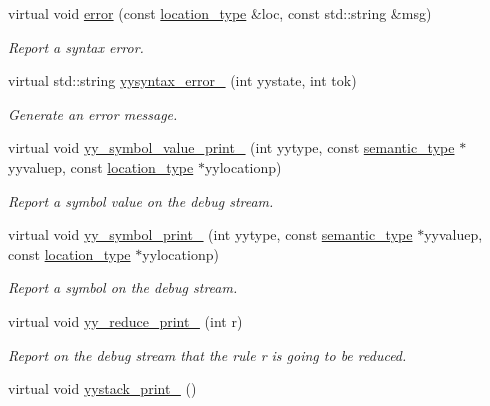 \begin{DoxyCompactItemize}
\item 
virtual void \hyperlink{classyy_1_1CParser_a693a79aaae672751347350ad9f3498f6}{error} (const \hyperlink{classyy_1_1CParser_a674649435d1e3521d1e820a5139f7232}{location\-\_\-type} \&loc, const std\-::string \&msg)
\begin{DoxyCompactList}\small\item\em Report a syntax error. \end{DoxyCompactList}\item 
virtual std\-::string \hyperlink{classyy_1_1CParser_a6d1ef79065605df3e89d4e2d92d6f17b}{yysyntax\-\_\-error\-\_\-} (int yystate, int tok)
\begin{DoxyCompactList}\small\item\em Generate an error message. \end{DoxyCompactList}\item 
virtual void \hyperlink{classyy_1_1CParser_a510cc68a99550d7e7e7b0746ac3652be}{yy\-\_\-symbol\-\_\-value\-\_\-print\-\_\-} (int yytype, const \hyperlink{unionyy_1_1CParser_1_1semantic__type}{semantic\-\_\-type} $\ast$yyvaluep, const \hyperlink{classyy_1_1CParser_a674649435d1e3521d1e820a5139f7232}{location\-\_\-type} $\ast$yylocationp)
\begin{DoxyCompactList}\small\item\em Report a symbol value on the debug stream. \end{DoxyCompactList}\item 
virtual void \hyperlink{classyy_1_1CParser_a8b34b8427d5029c3606d4a4475b27aa0}{yy\-\_\-symbol\-\_\-print\-\_\-} (int yytype, const \hyperlink{unionyy_1_1CParser_1_1semantic__type}{semantic\-\_\-type} $\ast$yyvaluep, const \hyperlink{classyy_1_1CParser_a674649435d1e3521d1e820a5139f7232}{location\-\_\-type} $\ast$yylocationp)
\begin{DoxyCompactList}\small\item\em Report a symbol on the debug stream. \end{DoxyCompactList}\item 
\hypertarget{classyy_1_1CParser_afc7ab789401270378edc1307deca6c5e}{virtual void \hyperlink{classyy_1_1CParser_afc7ab789401270378edc1307deca6c5e}{yy\-\_\-reduce\-\_\-print\-\_\-} (int r)}\label{classyy_1_1CParser_afc7ab789401270378edc1307deca6c5e}

\begin{DoxyCompactList}\small\item\em Report on the debug stream that the rule {\itshape r} is going to be reduced. \end{DoxyCompactList}\item 
\hypertarget{classyy_1_1CParser_aa92f8df6e1c9873ee5856436331423a2}{virtual void \hyperlink{classyy_1_1CParser_aa92f8df6e1c9873ee5856436331423a2}{yystack\-\_\-print\-\_\-} ()}\label{classyy_1_1CParser_aa92f8df6e1c9873ee5856436331423a2}


\end{DoxyCompactItemize}
